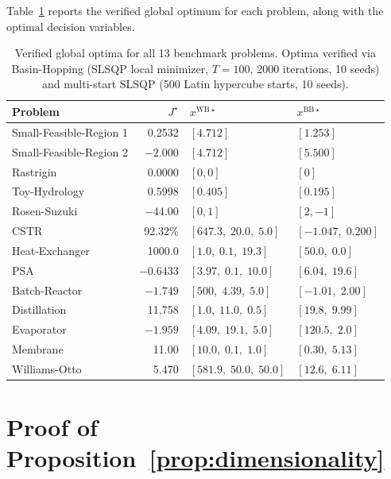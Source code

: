 \documentclass[12pt,a4paper]{article}%
\theoremstyle{plain}%
\theoremstyle{remark}%
\theoremstyle{definition}%
\def\WB{\mathrm{WB}}
\def\BB{\mathrm{BB}}
\begin{document}
\begin{appendices}
Table~\ref{tab:verified_optima} reports the verified global optimum for each problem, along with the optimal decision variables.

\begin{table}[htbp]
\centering
\caption{Verified global optima for all 13 benchmark problems. Optima verified via Basin-Hopping (SLSQP local minimizer, $T=100$, 2000 iterations, 10 seeds) and multi-start SLSQP (500 Latin hypercube starts, 10 seeds).}
\label{tab:verified_optima}
\begin{tabular}{@{}lrll@{}}
\toprule
\textbf{Problem} & $J^\star$ & $x^{\WB\star}$ & $x^{\BB\star}$ \\
\midrule
Small-Feasible-Region 1 & 0.2532 & $[4.712]$ & $[1.253]$ \\
Small-Feasible-Region 2 & $-2.000$ & $[4.712]$ & $[5.500]$ \\
Rastrigin & 0.0000 & $[0, 0]$ & $[0]$ \\
Toy-Hydrology & 0.5998 & $[0.405]$ & $[0.195]$ \\
Rosen-Suzuki & $-44.00$ & $[0, 1]$ & $[2, -1]$ \\
\midrule
CSTR & 92.32\% & $[647.3,\; 20.0,\; 5.0]$ & $[-1.047,\; 0.200]$ \\
Heat-Exchanger & 1000.0 & $[1.0,\; 0.1,\; 19.3]$ & $[50.0,\; 0.0]$ \\
PSA & $-0.6433$ & $[3.97,\; 0.1,\; 10.0]$ & $[6.04,\; 19.6]$ \\
Batch-Reactor & $-1.749$ & $[500,\; 4.39,\; 5.0]$ & $[-1.01,\; 2.00]$ \\
Distillation & 11{,}758 & $[1.0,\; 11.0,\; 0.5]$ & $[19.8,\; 9.99]$ \\
Evaporator & $-1.959$ & $[4.09,\; 19.1,\; 5.0]$ & $[120.5,\; 2.0]$ \\
Membrane & 11.00 & $[10.0,\; 0.1,\; 1.0]$ & $[0.30,\; 5.13]$ \\
Williams-Otto & 5.470 & $[581.9,\; 50.0,\; 50.0]$ & $[12.6,\; 6.11]$ \\
\bottomrule
\end{tabular}
\end{table}

\section{Proof of Proposition~\ref{prop:dimensionality}}\label{sec:proof_dimensionality}


\end{appendices}
\end{document}
